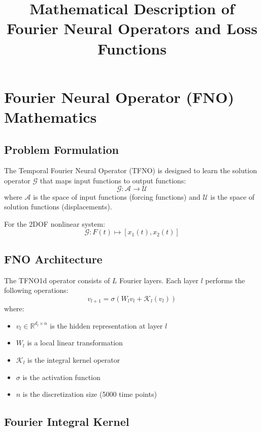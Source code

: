 \documentclass{article}
\title{Mathematical Description of Fourier Neural Operators and Loss Functions}
\author{}
\date{}
\begin{document}
\maketitle

\section{Fourier Neural Operator (FNO) Mathematics}

\subsection{Problem Formulation}

The Temporal Fourier Neural Operator (TFNO) is designed to learn the solution operator $\mathcal{G}$ that maps input functions to output functions:
\begin{equation}
\mathcal{G}: \mathcal{A} \rightarrow \mathcal{U}
\end{equation}
where $\mathcal{A}$ is the space of input functions (forcing functions) and $\mathcal{U}$ is the space of solution functions (displacements).

For the 2DOF nonlinear system:
\begin{equation}
\mathcal{G}: F(t) \mapsto [x_1(t), x_2(t)]
\end{equation}

\subsection{FNO Architecture}

The TFNO1d operator consists of $L$ Fourier layers. Each layer $l$ performs the following operations:
\begin{equation}
v_{l+1} = \sigma(W_l v_l + \mathcal{K}_l(v_l))
\end{equation}
where:
\begin{itemize}
\item $v_l \in \mathbb{R}^{d_l \times n}$ is the hidden representation at layer $l$
\item $W_l$ is a local linear transformation
\item $\mathcal{K}_l$ is the integral kernel operator
\item $\sigma$ is the activation function
\item $n$ is the discretization size (5000 time points)
\end{itemize}

\subsection{Fourier Integral Kernel}
\end{document}
